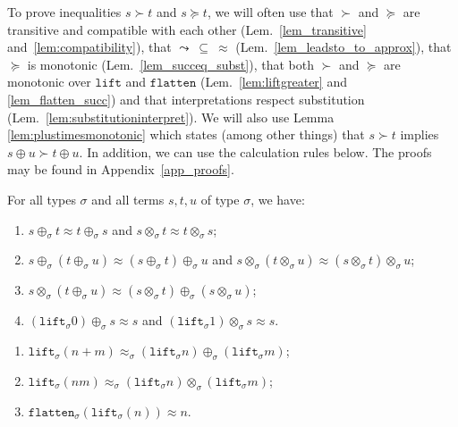 \documentclass[a4paper,UKenglish,cleveref,autoref,numberwithinsect]{lipics-v2019}
\theoremstyle{definition}
\newcommand{\arrW}{\leadsto}
\newcommand{\flatten}{\mathtt{flatten}}
\newcommand{\lift}{\mathtt{lift}}
\begin{document}
To prove inequalities $s \succ t$ and $s \succeq t$, we will often
use that $\succ$ and $\succeq$ are transitive and compatible with each
other (Lem.~\ref{lem_transitive} and~\ref{lem:compatibility}), that
$\arrW\:\subseteq\:\approx$ (Lem.~\ref{lem_leadsto_to_approx}),
that $\succeq$ is monotonic (Lem.~\ref{lem_succeq_subst}),
that both $\succ$ and $\succeq$ are monotonic over $\lift$ and $\flatten$
(Lem.~\ref{lem:liftgreater} and \ref{lem_flatten_succ}) and that
interpretations respect substitution
(Lem.~\ref{lem:substitutioninterpret}). We will also use
Lemma \ref{lem:plustimesmonotonic} which states (among other things)
that $s \succ t$ implies $s \oplus u \succ t \oplus u$.
In addition, we can use the
calculation rules below. The proofs may be found in
Appendix~\ref{app_proofs}.

\begin{lemma}\label{lem:approxproperties}
For all types $\sigma$ and all terms $s,t,u$ of type $\sigma$, we
have:
\begin{enumerate}
\item\label{lem:approx:symmetry} $s \oplus_\sigma t \approx t
  \oplus_\sigma s$ and $s \otimes_\sigma t \approx t \otimes_\sigma
  s$;
\item\label{lem:approx:assoc} $s \oplus_\sigma (t \oplus_\sigma u)
  \approx (s \oplus_\sigma t) \oplus_\sigma u$ and $s \otimes_\sigma
  (t \otimes_\sigma u) \approx (s \otimes_\sigma t) \otimes_\sigma u$;
\item\label{lem:approx:distribution} $s \otimes_\sigma (t
  \oplus_\sigma u) \approx (s \otimes_\sigma t) \oplus_\sigma (s
  \otimes_\sigma u)$;
\item\label{lem:approx:neutral} $(\lift_\sigma 0) \oplus_\sigma s
  \approx s$ and $(\lift_\sigma 1) \otimes_\sigma s \approx s$.
\end{enumerate}
\end{lemma}

\begin{lemma}\label{lem_lift_approx}
  \begin{enumerate}
  \item\label{lem_lift_approx:plussplit}
    $\lift_\sigma(n+m) \approx_\sigma (\lift_\sigma n)
    \oplus_\sigma (\lift_\sigma m)$;
  \item $\lift_\sigma(n m) \approx_\sigma (\lift_\sigma n)
    \otimes_\sigma (\lift_\sigma m)$;
  \item $\flatten_\sigma(\lift_\sigma(n)) \approx n$.
  \end{enumerate}
\end{lemma}
\end{document}
